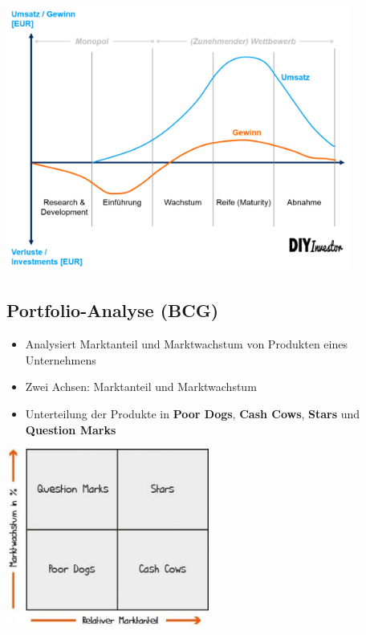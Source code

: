 \documentclass[titlepage,parskip=half]{scrartcl}
\begin{document}
\begin{center}
    \includegraphics[width=0.85\textwidth]{bilder/produktlebenszyklus.png}
\end{center}

\subsection{Portfolio-Analyse (BCG)}
\begin{itemize}
    \item Analysiert Marktanteil und Marktwachstum von Produkten eines Unternehmens
    \item Zwei Achsen: Marktanteil und Marktwachstum
    \item Unterteilung der Produkte in \textbf{Poor Dogs}, \textbf{Cash Cows}, \textbf{Stars} und \textbf{Question Marks}
\end{itemize}

\begin{center}
    \includegraphics[width=0.5\textwidth]{bilder/portfolioanalyse.jpg}
\end{center}
\end{document}
